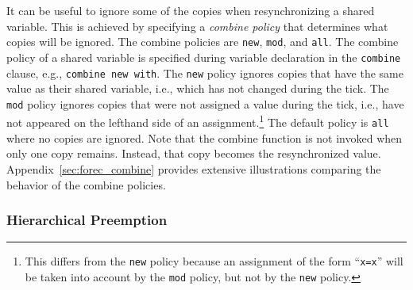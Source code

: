 It can be useful to ignore some of the copies when
resynchronizing a shared variable. This is achieved by
specifying a \emph{combine policy} that determines what
copies will be ignored. The combine policies are \verb$new$,
\verb$mod$, and \verb$all$. The combine policy of a shared
variable is specified during variable declaration in the
\verb$combine$ clause, e.g., \verb$combine new with$. The
\verb$new$ policy ignores copies that have the same
value as their shared variable, i.e., which has not changed during 
the tick. 
The \verb$mod$ policy ignores copies that were
not assigned a value during the tick, i.e., have not appeared on
the lefthand side of an assignment.\footnote{This differs 
from the \texttt{new} policy because an assignment 
of the form ``\texttt{x=x}'' will be taken into account by the 
\texttt{mod} policy, but not by the \texttt{new} policy.} The default policy is
\verb$all$ where no copies are ignored. Note that the
combine function is not invoked when only one copy remains.
Instead, that copy becomes the resynchronized value. 
Appendix~\ref{sec:forec_combine} provides extensive 
illustrations comparing the behavior of the combine policies.




\subsubsection{Hierarchical Preemption}
\label{sec:forec:preemption}

